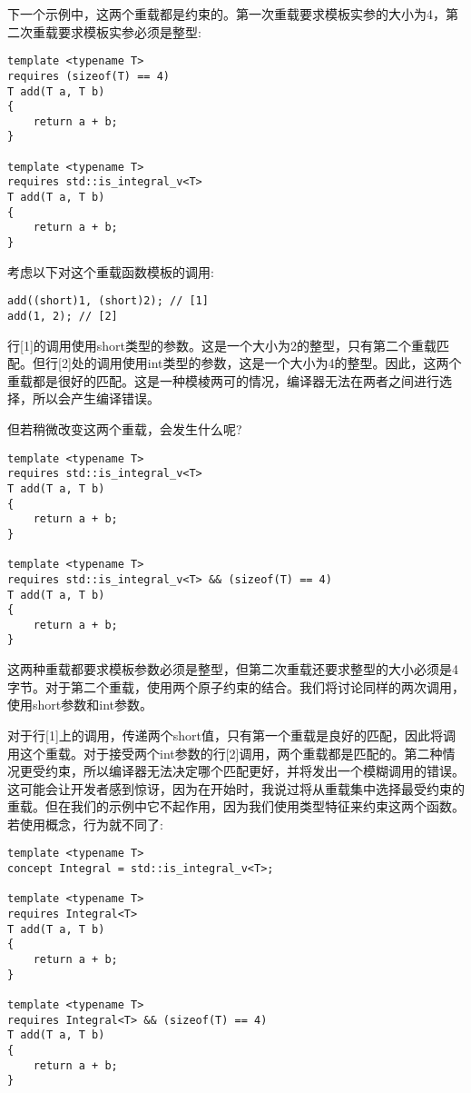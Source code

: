 下一个示例中，这两个重载都是约束的。第一次重载要求模板实参的大小为4，第二次重载要求模板实参必须是整型:

\begin{lstlisting}[style=styleCXX]
template <typename T>
requires (sizeof(T) == 4)
T add(T a, T b)
{
	return a + b;
}

template <typename T>
requires std::is_integral_v<T>
T add(T a, T b)
{
	return a + b;
}
\end{lstlisting}

考虑以下对这个重载函数模板的调用:

\begin{lstlisting}[style=styleCXX]
add((short)1, (short)2); // [1]
add(1, 2); // [2]
\end{lstlisting}

行[1]的调用使用short类型的参数。这是一个大小为2的整型，只有第二个重载匹配。但行[2]处的调用使用int类型的参数，这是一个大小为4的整型。因此，这两个重载都是很好的匹配。这是一种模棱两可的情况，编译器无法在两者之间进行选择，所以会产生编译错误。

但若稍微改变这两个重载，会发生什么呢?

\begin{lstlisting}[style=styleCXX]
template <typename T>
requires std::is_integral_v<T>
T add(T a, T b)
{
	return a + b;
}

template <typename T>
requires std::is_integral_v<T> && (sizeof(T) == 4)
T add(T a, T b)
{
	return a + b;
}
\end{lstlisting}

这两种重载都要求模板参数必须是整型，但第二次重载还要求整型的大小必须是4字节。对于第二个重载，使用两个原子约束的结合。我们将讨论同样的两次调用，使用short参数和int参数。

对于行[1]上的调用，传递两个short值，只有第一个重载是良好的匹配，因此将调用这个重载。对于接受两个int参数的行[2]调用，两个重载都是匹配的。第二种情况更受约束，所以编译器无法决定哪个匹配更好，并将发出一个模糊调用的错误。这可能会让开发者感到惊讶，因为在开始时，我说过将从重载集中选择最受约束的重载。但在我们的示例中它不起作用，因为我们使用类型特征来约束这两个函数。若使用概念，行为就不同了:

\begin{lstlisting}[style=styleCXX]
template <typename T>
concept Integral = std::is_integral_v<T>;

template <typename T>
requires Integral<T>
T add(T a, T b)
{
	return a + b;
}

template <typename T>
requires Integral<T> && (sizeof(T) == 4)
T add(T a, T b)
{
	return a + b;
}
\end{lstlisting}

